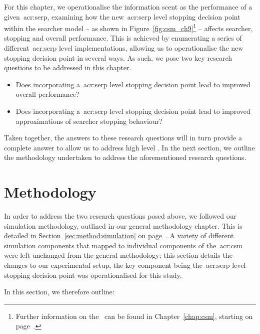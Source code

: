 For this chapter, we operationalise the information scent as the performance of a given~\gls{acr:serp}, examining how the new~\gls{acr:serp} level stopping decision point within the searcher model -- as shown in Figure~\ref{fig:csm_ch9}\footnote{Further information on the~ can be found in Chapter~\ref{chap:csm}, starting on page~\pageref{chap:csm}.} -- affects searcher, stopping and overall performance. This is achieved by enumerating a series of different~\gls{acr:serp} level implementations, allowing us to operationalise the new stopping decision point in several ways. As such, we pose two key research questions to be addressed in this chapter.

\begin{itemize}
    \item[]{ Does incorporating a~\gls{acr:serp} level stopping decision point lead to improved overall performance?}
    \item[]{ Does incorporating a~\gls{acr:serp} level stopping decision point lead to improved approximations of searcher stopping behaviour?}
\end{itemize}

Taken together, the answers to these research questions will in turn provide a complete answer to allow us to address high level . In the next section, we outline the methodology undertaken to address the aforementioned research questions.

\section{Methodology}
In order to address the two research questions posed above, we followed our simulation methodology, outlined in our general methodology chapter. This is detailed in Section~\ref{sec:method:simulation} on page~\pageref{sec:method:simulation}. A variety of different simulation components that mapped to individual components of the~\gls{acr:csm} were left unchanged from the general methodology; this section details the changes to our experimental setup, the key component being the~\gls{acr:serp} level stopping decision point was operationalised for this study.

In this section, we therefore outline:

